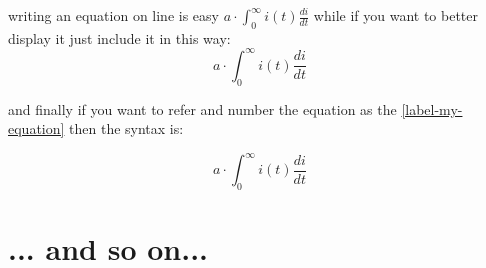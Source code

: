 writing an equation on line is easy $a \cdot \int^{\infty}_0 i(t)
\frac{di}{dt}$
while if you want to better display it just include it in this way:
$$a \cdot \int^{\infty}_0 i(t) \frac{di}{dt}$$

and finally if you want to refer and number the equation as the
\ref{label-my-equation} then the syntax is:

\begin{equation}
a \cdot \int^{\infty}_0 i(t) \frac{di}{dt}
\label{label-my-equation}
\end{equation}

\chapter{... and so on...}



